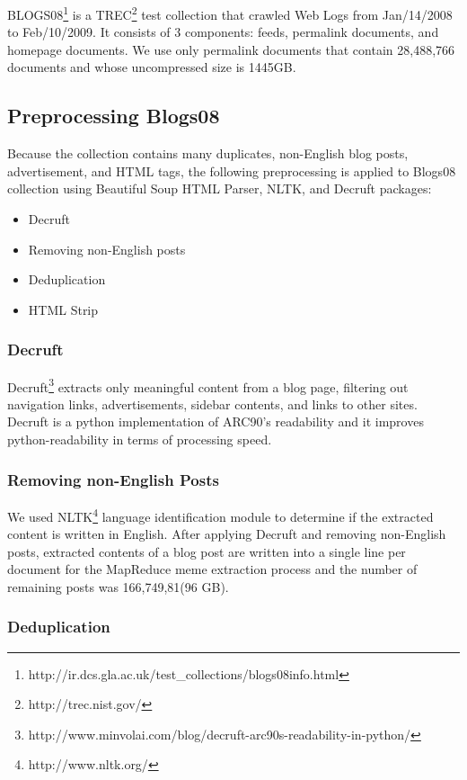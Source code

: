 \documentclass{sig-alternate}
\begin{document}
BLOGS08\footnote{http://ir.dcs.gla.ac.uk/test\_collections/blogs08info.html} is a TREC\footnote{http://trec.nist.gov/} test collection that crawled Web Logs from Jan/14/2008 to Feb/10/2009. It consists of 3 components: feeds, permalink documents, and homepage documents. We use only permalink documents that contain 28,488,766 documents and whose uncompressed size is 1445GB. 

\subsection{Preprocessing Blogs08}

Because the collection contains many duplicates, non-English blog posts, advertisement, and HTML tags, the following preprocessing is applied to Blogs08 collection using Beautiful Soup HTML Parser, NLTK, and Decruft packages:

\begin{itemize}
\item Decruft
\item Removing non-English posts
\item Deduplication
\item HTML Strip
\end{itemize}


\subsubsection{Decruft}
Decruft\footnote{http://www.minvolai.com/blog/decruft-arc90s-readability-in-python/} extracts only meaningful content from a blog page, filtering out navigation links, advertisements, sidebar contents, and links to other sites. Decruft is a python implementation of ARC90's readability and it improves python-readability in terms of processing speed. 

\subsubsection{Removing non-English Posts}
We used NLTK\footnote{http://www.nltk.org/} language identification module to determine if the extracted content is written in English. After applying Decruft and removing non-English posts, extracted contents of a blog post are written into a single line per document for the MapReduce meme extraction process and the number of remaining posts was 166,749,81(96 GB).

\subsubsection{Deduplication}
\end{document}
